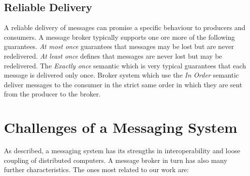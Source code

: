 \subsection{Reliable Delivery}
    A reliable delivery of messages can promise a specific behaviour to producers
    and consumers. A message broker typically supports one ore more of the
    following guarantees.
    \textit{At most once} guarantees that messages may be lost but are never
    redelivered. \textit{At least once} defines that messages are never lost
    but may be redelivered. The \textit{Exactly once} semantic which is very
    typical guarantees that each message is delivered only once. Broker system
    which use the \textit{In Order} semantic deliver messages to the consumer in
    the strict same order in which they are sent from the producer to the broker. 

\section{Challenges of a Messaging System}
\label{intro-messaging-characteristics}
As described, a messaging system has its strengths in interoperability and loose
coupling of distributed computers. 
A message broker in turn has also many further
characteristics. The ones most related to our work are:

